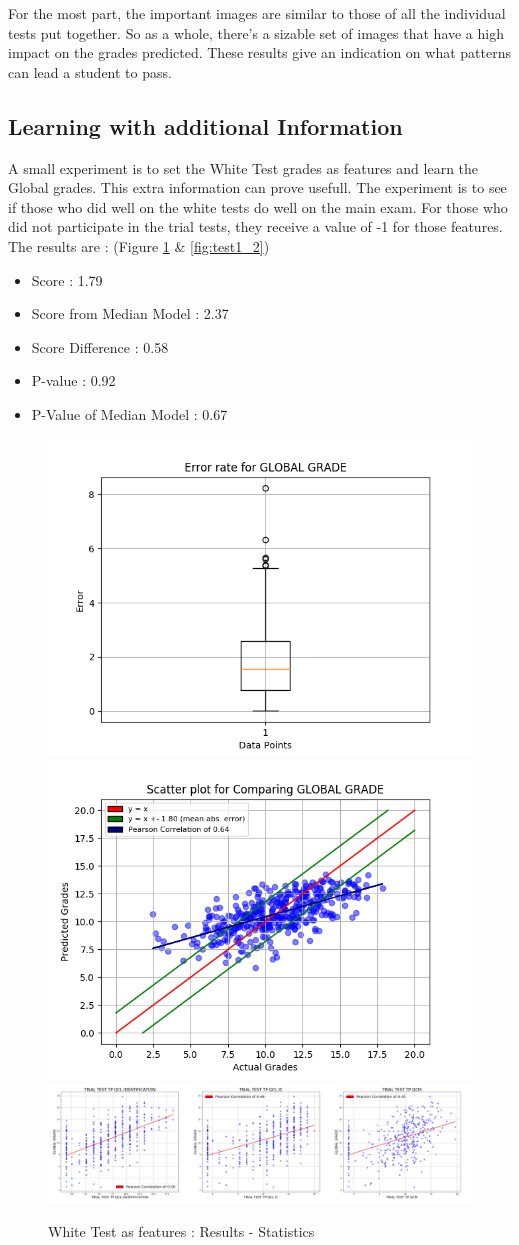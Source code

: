 \documentclass[a4paper,11pt]{report}
\numberwithin{figure}{section} %
\begin{document}
    For the most part, the important images are similar to those of all the individual tests put together.
    So as a whole, there's a sizable set of images that have a high impact on the grades predicted.
    These results give an indication on what patterns can lead a student to pass.

    \subsection{Learning with additional Information}

    A small experiment is to set the White Test grades as features and learn the Global grades.
    This extra information can prove usefull.
    The experiment is to see if those who did well on the white tests do well on the main exam.
    For those who did not participate in the trial tests, they receive a value of -1 for those features.
    The results are : (Figure \ref{fig:test1_1} \& \ref{fig:test1_2})
    \begin{itemize}
        \item[\textbullet] Score : 1.79
        \item[\textbullet] Score from Median Model : 2.37
        \item[\textbullet] Score Difference : 0.58
        \item[\textbullet] P-value : 0.92
        \item[\textbullet] P-Value of Median Model : 0.67
    \end{itemize}
      \begin{figure}[H]
      \centering
      \includegraphics[width=.40\linewidth]{plots/test1_cv_boxplot_GLOBAL_GRADE_2018-05-17_20_39_42.png}
      \includegraphics[width=.40\linewidth]{plots/test1_cv_comp_GLOBAL_GRADE_2018-05-17_20_39_42.png}\\
      \includegraphics[width=.95\linewidth]{plots/test1_var_correlation_GLOBAL_GRADE_2018-05-17_10_12_19.png}
      \caption{White Test as features : Results - Statistics}
      \label{fig:test1_1}
      \end{figure}
\end{document}
